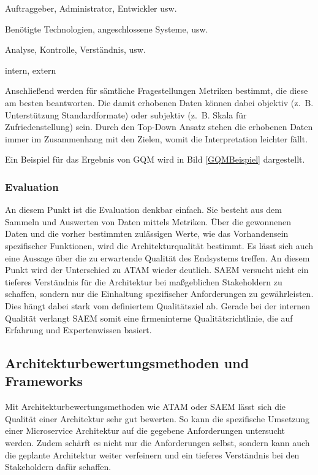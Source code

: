 \begin{description}[leftmargin=!,labelwidth=\widthof{\bfseries Anwendungsbereich}]
	\item[Sichtweise] Auftraggeber, Administrator, Entwickler usw.
	\item[Anwendungsbereich] Benötigte Technologien, angeschlossene Systeme, usw.
	\item[Zweck] Analyse, Kontrolle, Verständnis, usw.
	\item[Kontext] intern, extern
\end{description} 
 
Anschließend werden für sämtliche Fragestellungen Metriken bestimmt, die diese am besten beantworten. Die damit erhobenen Daten können dabei objektiv (z.~B. Unterstützung Standardformate) oder subjektiv (z.~B. Skala für Zufriedenstellung) sein.
Durch den Top-Down Ansatz stehen die erhobenen Daten immer im Zusammenhang mit den Zielen, womit die Interpretation leichter fällt. 

Ein Beispiel für das Ergebnis von \ac{GQM} wird in Bild \ref{GQMBeispiel} dargestellt.

 
\subsubsection{Evaluation}
An diesem Punkt ist die Evaluation denkbar einfach. Sie besteht aus dem Sammeln und Auswerten von Daten mittels Metriken. Über die gewonnenen Daten und die vorher bestimmten zulässigen Werte, wie das Vorhandensein spezifischer Funktionen, wird die Architekturqualität bestimmt. Es lässt sich auch eine Aussage über die zu erwartende Qualität des Endsystems treffen.
An diesem Punkt wird der Unterschied zu \ac{ATAM} wieder deutlich. \ac{SAEM} versucht nicht ein tieferes Verständnis für die Architektur bei maßgeblichen Stakeholdern zu schaffen, sondern nur die Einhaltung spezifischer Anforderungen zu gewährleisten. Dies hängt dabei stark vom definiertem Qualitätsziel ab. Gerade bei der internen Qualität verlangt \ac{SAEM} somit eine firmeninterne Qualitätsrichtlinie\cite{IEEE_TSE2002}, die auf Erfahrung und Expertenwissen basiert.

\subsection{Architekturbewertungsmethoden und Frameworks}
Mit Architekturbewertungsmethoden wie \ac{ATAM} oder \ac{SAEM} lässt sich die Qualität einer Architektur sehr gut bewerten. So kann die spezifische Umsetzung einer Microservice Architektur auf die gegebene Anforderungen untersucht werden. Zudem schärft es nicht nur die Anforderungen selbst, sondern kann auch die geplante Architektur weiter verfeinern und ein tieferes Verständnis bei den Stakeholdern dafür schaffen.

